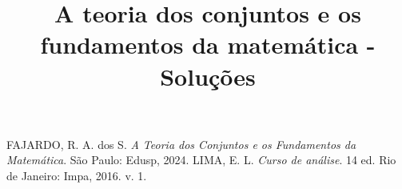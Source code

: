 \documentclass[portuguese,12pt,a4paper]{book}
\title{A teoria dos conjuntos e os fundamentos da matemática - Soluções}
\newcounter{ex}
\begin{document}
	
	\maketitle
	\tableofcontents
	
	
	
	
	
	
	
	
	
	
	
	
	
	
	\begin{thebibliography}{10}
		 FAJARDO, R. A. dos S. \textit{A Teoria dos Conjuntos e os Fundamentos da Matemática}. São Paulo: Edusp, 2024.
		 LIMA, E. L. \textit{Curso de análise}. 14 ed. Rio de Janeiro: Impa, 2016. v. 1.
	\end{thebibliography}
\end{document}
